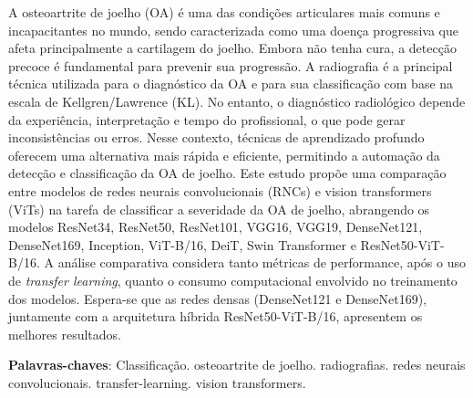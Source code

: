 
\setlength{\absparsep}{18pt} %
\begin{resumo}
A osteoartrite de joelho (OA) é uma das condições articulares mais comuns e incapacitantes no mundo, sendo caracterizada como uma doença progressiva que afeta principalmente a cartilagem do joelho. Embora não tenha cura, a detecção precoce é fundamental para prevenir sua progressão. A radiografia é a principal técnica utilizada para o diagnóstico da OA e para sua classificação com base na escala de Kellgren/Lawrence (KL). No entanto, o diagnóstico radiológico depende da experiência, interpretação e tempo do profissional, o que pode gerar inconsistências ou erros. Nesse contexto, técnicas de aprendizado profundo oferecem uma alternativa mais rápida e eficiente, permitindo a automação da detecção e classificação da OA de joelho. Este estudo propõe uma comparação entre modelos de redes neurais convolucionais (RNCs) e vision transformers (ViTs) na tarefa de classificar a severidade da OA de joelho, abrangendo os modelos ResNet34, ResNet50, ResNet101, VGG16, VGG19, DenseNet121, DenseNet169, Inception, ViT-B/16, DeiT, Swin Transformer e ResNet50-ViT-B/16. A análise comparativa considera tanto métricas de performance, após o uso de \textit{transfer learning}, quanto o consumo computacional envolvido no treinamento dos modelos. Espera-se que as redes densas (DenseNet121 e DenseNet169), juntamente com a arquitetura híbrida ResNet50-ViT-B/16, apresentem os melhores resultados.

 \textbf{Palavras-chaves}: Classificação. osteoartrite de joelho. radiografias. redes neurais convolucionais. transfer-learning. vision transformers.
\end{resumo}

